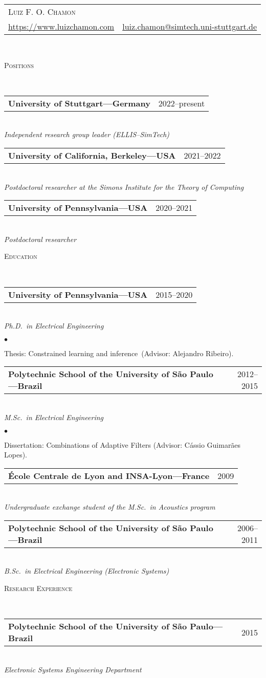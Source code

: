 \documentclass[a4paper,11pt]{article}
\makeatletter
\newcommand{\CVheader}[4]{
	\begin{tabular*}{\textwidth}{lr}
		\multicolumn{2}{l}{{\Huge \textsc{#1}} \vspace{1mm}}
		\\
		\begin{minipage}{0.5\textwidth}
			\href{#3}{#4}
		\end{minipage}
		&
		\begin{minipage}{0.5\textwidth}
			\flushright \href{mailto:#2}{#2}
		\end{minipage}
		\\
	\end{tabular*} \\ \vspace{1mm}
}
\newcommand{\CVheading}[1]{
	\vspace{10pt}
	{ \large
	\begin{minipage}{\textwidth}
		\textsc{#1 \vphantom{p\^{E}}}
	\end{minipage} } \\
	\vspace{5pt}
}
\newcommand{\CVsubheading}[2]{
	\begin{tabular*}{\textwidth}{l@{\extracolsep{\fill}}r}
		\textbf{#1} & #2 \\
	\end{tabular*} \\
}
\newcommand{\CVlist}{
	\begin{list}{$\bullet$}{
	\setlength{\itemsep}{0pt}
	\setlength{\parsep}{1pt}
	\setlength{\topsep}{1pt}
	\setlength{\partopsep}{0pt}
	\setlength{\leftmargin}{24pt}
	\setlength{\labelwidth}{1em} }
}
\newcommand{\CVlistend}{
	\end{list}
	\vspace{3pt}
}
\makeatother
\begin{document}
\CVheader%
{Luiz F. O. Chamon}%
{luiz.chamon@simtech.uni-stuttgart.de}%
{https://www.luizchamon.com}{https://www.luizchamon.com}




\CVheading{Positions}

\CVsubheading{University of Stuttgart---Germany}{2022--present}
\textit{Independent research group leader (ELLIS--SimTech)}
\vspace{3pt}


\CVsubheading{University of California, Berkeley---USA}{2021--2022}
\textit{Postdoctoral researcher at the Simons Institute for the Theory of Computing}
\vspace{3pt}

\CVsubheading{University of Pennsylvania---USA}{2020--2021}
\textit{Postdoctoral researcher}
\vspace{3pt}


\CVheading{Education}

\CVsubheading{University of Pennsylvania---USA}{2015--2020}
\textit{Ph.D.\ in Electrical Engineering}

	\CVlist

	\item Thesis: Constrained learning and inference~(Advisor: Alejandro Ribeiro).

	\CVlistend



\CVsubheading{Polytechnic School of the University of São Paulo---Brazil}{2012--2015}
\textit{M.Sc.\ in Electrical Engineering}

	\CVlist

	\item Dissertation: Combinations of Adaptive Filters (Advisor: C\'{a}ssio Guimar\~{a}es Lopes).

	\CVlistend


\CVsubheading{École Centrale de Lyon {\normalfont and} INSA-Lyon---France}{2009}
\textit{Undergraduate exchange student of the M.Sc.\ in Acoustics program}
\vspace{3pt}


\CVsubheading{Polytechnic School of the University of São Paulo---Brazil}{2006--2011}
\textit{B.Sc.\ in Electrical Engineering (Electronic Systems)}
\vspace{3pt}




\CVheading{Research Experience}


\CVsubheading{Polytechnic School of the University of São Paulo---Brazil}{2015}
\textit{Electronic Systems Engineering Department}
\end{document}
